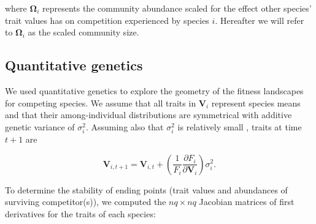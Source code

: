 \noindent where $\mathbf{\Omega}_i$ represents the community abundance scaled
for the effect other species' trait values has on competition
experienced by species $i$.
Hereafter we will refer to $\mathbf{\Omega}_i$ as the scaled community size.




%


\subsection*{Quantitative genetics}

We used quantitative genetics to explore the geometry of the fitness landscapes for
competing species.
We assume that all traits in $\mathbf{V}_i$ represent species means and that their
among-individual distributions are symmetrical with additive genetic variance
of $\sigma^2_i$.
Assuming also that $\sigma^2_i$ is relatively small
\citep{Iwasa:1991eo,Abrams:2001va,Abrams:1993cr}, traits at time $t+1$ are

\begin{equation} \label{eq:trait-change}
    \mathbf{V}_{i,t+1} = \mathbf{V}_{i,t} + \left( \frac{1}{F_i}
        \frac{\partial F_i}{\partial \mathbf{V}_{i}} \right) \sigma^2_i
    \textrm{.}
\end{equation}


To determine the stability of ending points (trait values and abundances of surviving
competitor(s)), we computed the $nq \times nq$ Jacobian matrices of first derivatives
for the traits of each species:

